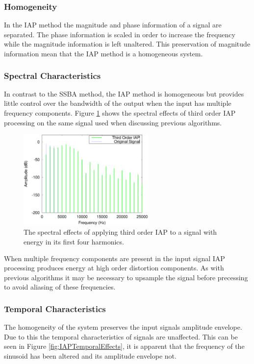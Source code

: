 		\subsubsection*{Homogeneity}
			In the IAP method the magnitude and phase information of a signal are separated. The phase
			information is scaled in order to increase the frequency while the magnitude information is left
			unaltered. This preservation of magnitude information mean that the IAP method is a homogeneous
			system.
			
		\subsubsection*{Spectral Characteristics}
			In contrast to the SSBA method, the IAP method is homogeneous but provides little control over the
			bandwidth of the output when the input has multiple frequency components. Figure
			\ref{fig:IAP3Spectra} shows the spectral effects of third order IAP processing on the same signal
			used when discussing previous algorithms.

			\begin{figure}[h!]
				\centering
				\includegraphics[width=0.6\textwidth]{chapter3/Images/IAP3Spectra.eps}
				\caption{The spectral effects of applying third order IAP to a signal with energy in its 
				         first four harmonics.}
				\label{fig:IAP3Spectra}
			\end{figure}

			When multiple frequency components are present in the input signal IAP processing produces energy
			at high order distortion components. As with previous algorithms it may be necessary to upsample
			the signal before precessing to avoid aliasing of these frequencies.

		\subsubsection*{Temporal Characteristics}
			The homogeneity of the system preserves the input signals amplitude envelope. Due to this the
			temporal characteristics of signals are unaffected. This can be seen in Figure
			\ref{fig:IAPTemporalEffects}, it is apparent that the frequency of the sinusoid has been altered
			and its amplitude envelope not.

